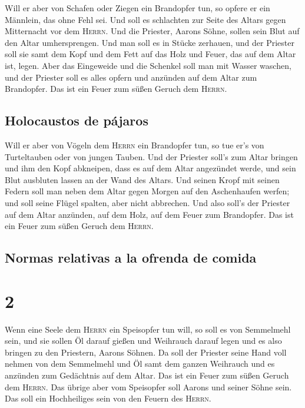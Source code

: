  Will er aber von Schafen oder Ziegen ein Brandopfer tun,
so opfere er ein Männlein, das ohne Fehl sei.  Und soll
es schlachten zur Seite des Altars gegen Mitternacht vor dem
\textsc{Herrn}. Und die Priester, Aarons Söhne, sollen sein Blut auf den
Altar umhersprengen.  Und man soll es in Stücke zerhauen,
und der Priester soll sie samt dem Kopf und dem Fett auf das Holz und
Feuer, das auf dem Altar ist, legen.  Aber das Eingeweide
und die Schenkel soll man mit Wasser waschen, und der Priester soll es
alles opfern und anzünden auf dem Altar zum Brandopfer. Das ist ein
Feuer zum süßen Geruch dem \textsc{Herrn}.

\hypertarget{holocaustos-de-puxe1jaros}{%
\subsection{Holocaustos de pájaros}\label{holocaustos-de-puxe1jaros}}

 Will er aber von Vögeln dem \textsc{Herrn} ein
Brandopfer tun, so tue er's von Turteltauben oder von jungen Tauben.
 Und der Priester soll's zum Altar bringen und ihm den
Kopf abkneipen, dass es auf dem Altar angezündet werde, und sein Blut
ausbluten lassen an der Wand des Altars.  Und seinen
Kropf mit seinen Federn soll man neben dem Altar gegen Morgen auf den
Aschenhaufen werfen;  und soll seine Flügel spalten, aber
nicht abbrechen. Und also soll's der Priester auf dem Altar anzünden,
auf dem Holz, auf dem Feuer zum Brandopfer. Das ist ein Feuer zum süßen
Geruch dem \textsc{Herrn}.

\hypertarget{normas-relativas-a-la-ofrenda-de-comida}{%
\subsection{Normas relativas a la ofrenda de
comida}\label{normas-relativas-a-la-ofrenda-de-comida}}

\hypertarget{section-1}{%
\section{2}\label{section-1}}

 Wenn eine Seele dem \textsc{Herrn} ein Speisopfer tun
will, so soll es von Semmelmehl sein, und sie sollen Öl darauf gießen
und Weihrauch darauf legen  und es also bringen zu den
Priestern, Aarons Söhnen. Da soll der Priester seine Hand voll nehmen
von dem Semmelmehl und Öl samt dem ganzen Weihrauch und es anzünden zum
Gedächtnis auf dem Altar. Das ist ein Feuer zum süßen Geruch dem
\textsc{Herrn}.  Das übrige aber vom Speisopfer soll
Aarons und seiner Söhne sein. Das soll ein Hochheiliges sein von den
Feuern des \textsc{Herrn}.

